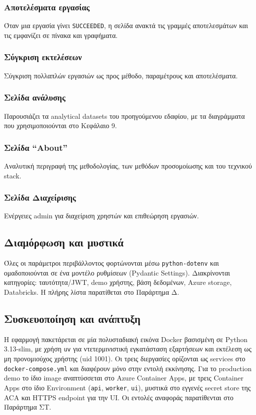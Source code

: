 \documentclass[12pt]{article}
\begin{document}
\subsubsection{Αποτελέσματα εργασίας}
Όταν μια εργασία γίνει \texttt{SUCCEEDED}, η σελίδα ανακτά τις γραμμές αποτελεσμάτων και τις εμφανίζει σε πίνακα και γραφήματα.

\subsubsection{Σύγκριση εκτελέσεων}
Σύγκριση πολλαπλών εργασιών ως προς μέθοδο, παραμέτρους και αποτελέσματα.

\subsubsection{Σελίδα ανάλυσης}
Παρουσιάζει τα analytical datasets του προηγούμενου εδαφίου, με τα διαγράμματα που χρησιμοποιούνται στο Κεφάλαιο 9.

\subsubsection{Σελίδα ``About''}
Αναλυτική περιγραφή της μεθοδολογίας, των μεθόδων προσομοίωσης και του τεχνικού stack.

\subsubsection{Σελίδα Διαχείρισης}
Ενέργειες admin για διαχείριση χρηστών και επιθεώρηση εργασιών.

\subsection{Διαμόρφωση και μυστικά}
Όλες οι παράμετροι περιβάλλοντος φορτώνονται μέσω \texttt{python-dotenv} και ομαδοποιούνται σε ένα μοντέλο ρυθμίσεων (Pydantic Settings). Διακρίνονται κατηγορίες: ταυτότητα/JWT, demo χρήστης, βάση δεδομένων, Azure storage, Databricks. Η πλήρης λίστα παρατίθεται στο Παράρτημα Δ.

\subsection{Συσκευοποίηση και ανάπτυξη}
Η εφαρμογή πακετάρεται σε μία πολυσταδιακή εικόνα Docker βασισμένη σε Python 3.13-slim, με χρήση \texttt{uv} για ντετερμινιστική εγκατάσταση εξαρτήσεων και εκτέλεση ως μη προνομιούχος χρήστης (uid 1001). Οι τρεις διεργασίες ορίζονται ως services στο \texttt{docker-compose.yml} και διαφέρουν μόνο στην εντολή εκκίνησης. Για το production demo το ίδιο image αναπτύσσεται στο Azure Container Apps, με τρεις Container Apps στο ίδιο Environment (\texttt{api}, \texttt{worker}, \texttt{ui}), μυστικά στο εγγενές secret store της ACA και HTTPS endpoint για την UI. Οι εντολές αναφοράς παρατίθενται στο Παράρτημα ΣΤ.
\end{document}
